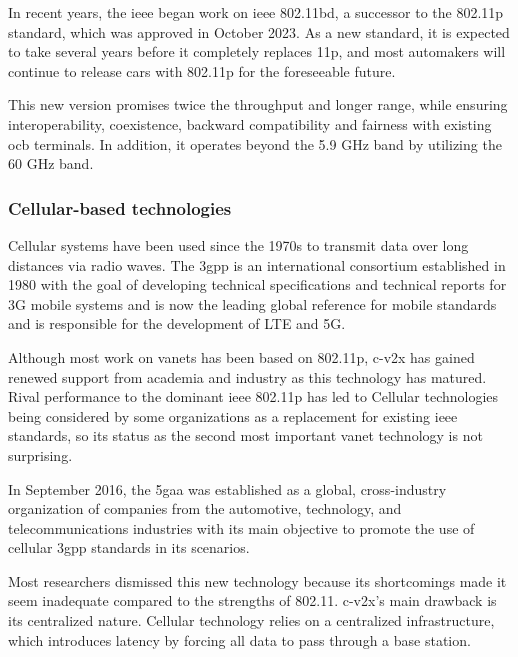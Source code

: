 In recent years, the \gls{ieee} began work on \gls{ieee} 802.11bd, a successor to the 802.11p standard, which was approved in October 2023\cite{noauthor_ieee_2023}. As a new standard, it is expected to take several years before it completely replaces 11p, and most automakers will continue to release cars with 802.11p for the foreseeable future.

This new version promises twice the throughput and longer range, while ensuring interoperability, coexistence, backward compatibility and fairness with existing \gls{ocb} terminals. In addition, it operates beyond the 5.9 GHz band by utilizing the 60 GHz band.


\subsubsection{Cellular-based technologies}
Cellular systems have been used since the 1970s to transmit data over long distances via radio waves\cite{anwer_survey_2014}. The \gls{3gpp} is an international consortium established in 1980 with the goal of developing technical specifications and technical reports for 3G mobile systems and is now the leading global reference for mobile standards and is responsible for the development of LTE and 5G\cite{noauthor_3gpp_nodate}.

Although most work on \glspl{vanet} has been based on 802.11p, \gls{c-v2x} has gained renewed support from academia and industry as this technology has matured\cite{gyawali_challenges_2021}. Rival performance to the dominant \gls{ieee} 802.11p has led to Cellular technologies being considered by some organizations as a replacement for existing \gls{ieee} standards, so its status as the second most important \gls{vanet} technology is not surprising.

In September 2016, the \gls{5gaa} was established as a global, cross-industry organization of companies from the automotive, technology, and telecommunications industries with its main objective to promote the use of cellular \gls{3gpp} standards in \gls{its} scenarios\cite{noauthor_5gaa_nodate}.

Most researchers dismissed this new technology because its shortcomings made it seem inadequate compared to the strengths of 802.11. \gls{c-v2x}'s main drawback is its centralized nature. Cellular technology relies on a centralized infrastructure, which introduces latency by forcing all data to pass through a base station.

